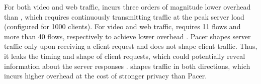 For both video and web traffic, {\ns} incurs three orders of magnitude lower
overhead than {\constshape}, which requires continuously transmitting traffic at
the peak server load (configured for 1000 clients).
%
%
For video and web traffic, {\ns} requires 11 flows and more than 40 flows,
respectively to achieve lower overhead {\pacer}.
Pacer shapes server traffic only upon receiving a client request and does not
shape client traffic. Thus, it leaks the timing and shape of client requests,
which could potentially reveal information about the server responses
\cite{chen2010reality}.
{\sys} shapes traffic in both directions, which incurs higher overhead at the
cost of stronger privacy than Pacer.






